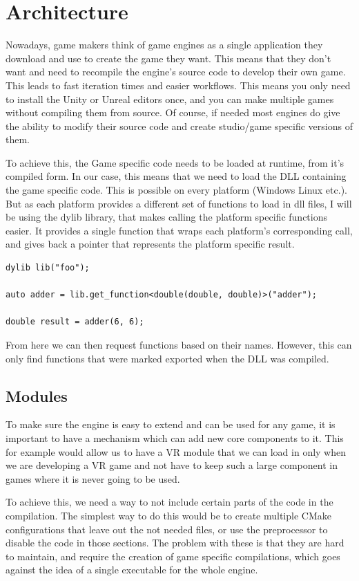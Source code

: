 \chapter{Architecture}

Nowadays, game makers think of game engines as a single application they download and use to create the game they want. This means that they don't want and need to recompile the engine's source code to develop their own game. This leads to fast iteration times and easier workflows. This means you only need to install the Unity or Unreal editors once, and you can make multiple games without compiling them from source. Of course, if needed most engines do give the ability to modify their source code and create studio/game specific versions of them.

To achieve this, the Game specific code needs to be loaded at runtime, from it's compiled form. In our case, this means that we need to load the DLL containing the game specific code. This is possible on every platform (Windows Linux etc.). But as each platform provides a different set of functions to load in dll files, I will be using the dylib \cite{dylib} library, that makes calling the platform specific functions easier. It provides a single function that wraps each platform's corresponding call, and gives back a pointer that represents the platform specific result.

\begin{verbatim}
dylib lib("foo");

auto adder = lib.get_function<double(double, double)>("adder");

double result = adder(6, 6);
\end{verbatim}

From here we can then request functions based on their names. However, this can only find functions that were marked exported when the DLL was compiled.


\section{Modules}
To make sure the engine is easy to extend and can be used for any game, it is important to have a mechanism which can add new core components to it. This for example would allow us to have a VR module that we can load in only when we are developing a VR game and not have to keep such a large component in games where it is never going to be used.

To achieve this, we need a way to not include certain parts of the code in the compilation. The simplest way to do this would be to create multiple CMake configurations that leave out the not needed files, or use the preprocessor to disable the code in those sections. The problem with these is that they are hard to maintain, and require the creation of game specific compilations, which goes against the idea of a single executable for the whole engine.

